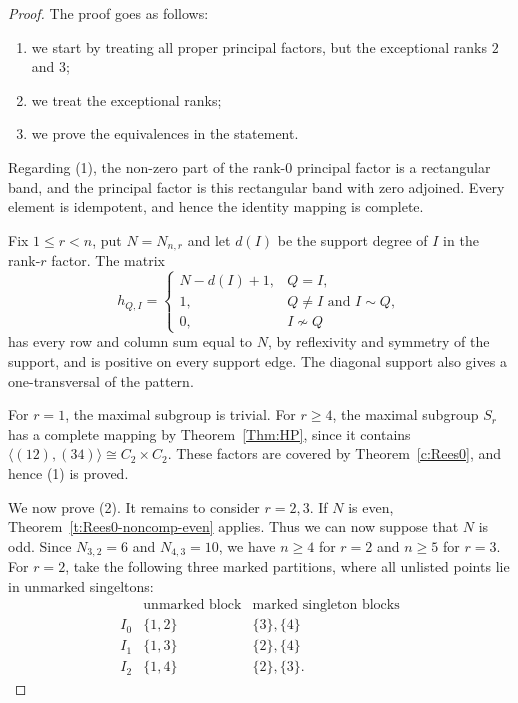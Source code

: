 \documentclass[11pt]{article}
\theoremstyle{plain}
\theoremstyle{remark}
\theoremstyle{definition}
\theoremstyle{plain}
\begin{document}
\begin{proof}
The proof goes as follows:
\begin{enumerate}
\item[(1)] we start by treating all proper principal factors, but the exceptional ranks
$2$ and $3$;
\item[(2)] we treat the exceptional ranks;
\item[(3)] we prove the equivalences in the statement.
\end{enumerate}

{Regarding  (1),} the non-zero part of the rank-$0$ principal factor
is a rectangular band, and the principal factor is this rectangular band
with zero adjoined. Every element is idempotent, and hence the identity
mapping is complete.

Fix $1\le r<n$, put $N=N_{n,r}$ and let $d(I)$ be the support degree of $I$
in the rank-$r$ factor. The matrix
\[
h_{Q,I}=
\begin{cases}
N-d(I)+1,&Q=I,\\
1,&Q\ne I\text{ and }I\sim Q,\\
0,&I\nsim Q
\end{cases}
\]
has every row and column sum equal to $N$, by reflexivity and symmetry of
the support, and is positive on every support edge. The diagonal support
also gives a one-transversal of the pattern.

For $r=1$, the maximal subgroup is trivial. For $r\ge4$, the maximal
subgroup $S_r$ has a complete mapping by Theorem~\ref{Thm:HP}, since it
contains $\langle(12),(34)\rangle\cong C_2\times C_2$. These factors are
covered by Theorem~\ref{c:Rees0}, and hence (1) is proved.

We now prove (2). It remains to consider $r=2,3$. If $N$ is even,
Theorem~\ref{t:Rees0-noncomp-even} applies. Thus we can now suppose that
$N$ is odd. Since $N_{3,2}=6$ and $N_{4,3}=10$, we have $n\ge4$ for $r=2$
and $n\ge5$ for $r=3$. For $r=2$, take the following three marked
partitions, where all unlisted points lie in unmarked singeltons:
\[
\begin{array}{c|c|c}
 &\text{unmarked block}&\text{marked singleton blocks}\\ \hline
I_0&\{1,2\}&\{3\},\{4\}\\
I_1&\{1,3\}&\{2\},\{4\}\\
I_2&\{1,4\}&\{2\},\{3\}.
\end{array}
\]


\end{proof}
\end{document}
